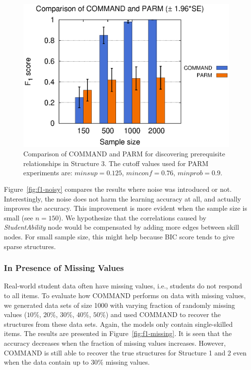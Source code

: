 \documentclass{edm_template}
\newcommand{\hl}[1]{\colorbox{yellow}{#1}}
\begin{document}
					\begin{figure}[!th]
						\begin{center}
							\centering
							\includegraphics[width=0.55\linewidth]{figures/F1_parm.eps}
						\end{center}
						\vspace{-1em}
						\caption{Comparison of COMMAND and PARM for discovering prerequisite relationships in Structure 3. The cutoff values used for PARM experiments are: $ minsup=0.125$, $minconf=0.76$, $minprob=0.9$.}
						\label{fig:f1-parm} 
					\end{figure} 			
	
	Figure~\ref{fig:f1-noisy} compares the results where noise was introduced or not.
	Interestingly, the noise does not harm the learning accuracy at all, and actually improves the accuracy.
	This improvement is more evident when the sample size is small (see $n=150$).
	We hypothesize that the correlations caused by \emph{StudentAbility} node would be compensated by adding more edges between skill nodes. 
	For small sample size, this might help because BIC score tends to give sparse structures.

	
	\subsubsection{In Presence of Missing Values}
	Real-world student data often have missing values, i.e., students do not respond to all items. %
	To evaluate how COMMAND performs on data with missing values, we generated data sets of size 1000 with varying fraction of randomly missing values ($10\%$, $20\%$, $30\%$, $40\%$, $50\%$) and used COMMAND to recover the structures from these data sets. Again, the models only contain single-skilled items.  
	The results are presented in Figure~\ref{fig:f1-missing}.
	It is seen that the accuracy decreases when the fraction of missing values increases. 
	However, COMMAND is still able to recover the true structures for Structure 1 and 2 even when the data contain up to $30\%$ missing values. 
	
\end{document}
